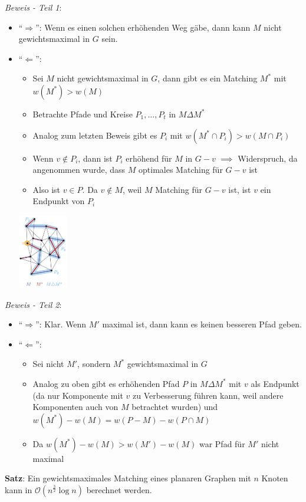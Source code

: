 \textit{Beweis - Teil 1}:
 \begin{itemize}
 	\item \enquote{$\Rightarrow$}: Wenn es einen solchen erhöhenden Weg gäbe, dann kann $M$ nicht gewichtsmaximal in $G$ sein.
 	\item \enquote{$\Leftarrow$}:
 	\begin{itemize}
 		\item Sei $M$ nicht gewichtsmaximal in $G$, dann gibt es ein Matching $M^*$ mit $w(M^*)>w(M)$
 		\item Betrachte Pfade und Kreise $P_1,\ldots,P_t$ in $M\Delta M^*$
 		\item Analog zum letzten Beweis gibt es $P_i$ mit $w(M^*\cap P_i)>w(M\cap P_i)$
 		\item Wenn $v\notin P_i$, dann ist $P_i$ erhöhend für $M$ in $G-v$ $\implies$ Widerspruch, da angenommen wurde, dass $M$ optimales Matching für $G-v$ ist
 		\item Also ist $v\in P$. Da $v\notin M$, weil $M$ Matching für $G-v$ ist, ist $v$ ein Endpunkt von $P_i$
 	\end{itemize}
	 \begin{center}
	 	\includegraphics[width=0.17\textwidth]{images/moag2.png}
	 \end{center}
 \end{itemize}
\bigskip
\textit{Beweis - Teil 2}: 
\begin{itemize}
	\item \enquote{$\Rightarrow$}: Klar. Wenn $M'$ maximal ist, dann kann es keinen besseren Pfad geben.
	\item \enquote{$\Leftarrow$}: 
	\begin{itemize}
		\item Sei nicht $M'$, sondern $M^*$ gewichtsmaximal in $G$
		\item Analog zu oben gibt es erhöhenden Pfad $P$ in $M\Delta M^*$ mit $v$ als Endpunkt (da nur Komponente mit $v$ zu Verbesserung führen kann, weil andere Komponenten auch von $M$ betrachtet wurden) und $w(M^*)-w(M)=w(P-M)-w(P\cap M)$
		\item Da $w(M^*)-w(M)>w(M')-w(M)$ war Pfad für $M'$ nicht maximal
	\end{itemize}
\end{itemize}
\bigskip
\textbf{Satz}: Ein gewichtsmaximales Matching eines planaren Graphen mit $n$ Knoten kann in $\mathcal{O}(n^{\frac{3}{2}}\log n)$ berechnet werden.

